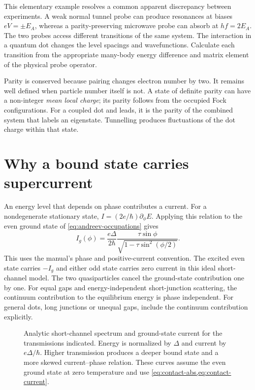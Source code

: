 This elementary example resolves a common apparent discrepancy between
experiments. A weak normal tunnel probe can produce resonances at biases
$eV=\pm E_A$, whereas a parity-preserving microwave probe can absorb at
$hf=2E_A$. The two probes access different transitions of the same system. The
interaction in a quantum dot changes the level spacings and wavefunctions.
Calculate each transition from the appropriate many-body energy difference
and matrix element of the physical probe operator.

Parity is conserved because pairing changes electron number by two. It remains
well defined when particle number itself is not. A state of definite parity can
have a non-integer \emph{mean local charge}; its parity follows from the occupied
Fock configurations. For a coupled dot and leads, it is the parity of the combined
system that labels an eigenstate. Tunnelling produces fluctuations of the dot charge within that state.

\section{Why a bound state carries supercurrent}

An energy level that depends on phase contributes a current. For a nondegenerate
stationary state, $I=(2e/\hbar)\partial_\phi E$. Applying this relation to the
even ground state of \cref{eq:andreev-occupations} gives
\begin{equation}\label{eq:contact-current}
 I_g(\phi)=\frac{e\Delta}{2\hbar}
 \frac{\tau\sin\phi}{\sqrt{1-\tau\sin^2(\phi/2)}}.
\end{equation}
This uses the manual's phase and positive-current convention. The excited even
state carries $-I_g$ and either odd state carries zero current in this ideal
short-channel model. The two quasiparticles cancel the ground-state contribution
one by one. For equal gaps and energy-independent short-junction scattering, the
continuum contribution to the equilibrium energy is phase independent. For general
dots, long junctions or unequal gaps, include the continuum contribution explicitly.

\begin{figure}[htb]
\centering{}
\caption{Analytic short-channel spectrum and ground-state current for the
transmissions indicated. Energy is normalized by $\Delta$ and current by
$e\Delta/\hbar$. Higher transmission produces a deeper bound state and a more
skewed current--phase relation. These curves assume the even ground state at zero
temperature and use \cref{eq:contact-abs,eq:contact-current}.}
\label{fig:primer-contact}
\end{figure}

